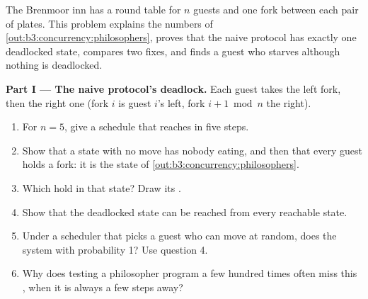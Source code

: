 \begin{problem}\label{pb:b3:concurrency:1}
The Brenmoor inn has a round table for $n$ guests and one fork between each pair of plates. This problem explains the numbers of \cref{out:b3:concurrency:philosophers}, proves that the naive protocol has exactly one deadlocked state, compares two fixes, and finds a guest who starves although nothing is deadlocked.

\label{lst:b3:concurrency:waiter}

\label{out:b3:concurrency:waiter}

\medskip\noindent\textbf{Part I --- The naive protocol's deadlock.} Each guest takes the left fork, then the right one (fork $i$ is guest $i$'s left, fork $i + 1 \bmod n$ the right).
\begin{enumerate}
\item For $n = 5$, give a schedule that reaches  in five steps.
\item Show that a state with no move has nobody eating, and then that every guest holds a fork: it is the state of \cref{out:b3:concurrency:philosophers}.
\item Which  hold in that state? Draw its .
\item Show that the deadlocked state can be reached from every reachable state.
\item Under a scheduler that picks a guest who can move at random, does the system  with probability 1? Use question 4.
\item Why does testing a philosopher program a few hundred times often miss this , when it is always a few steps away?
\end{enumerate}


\end{problem}
